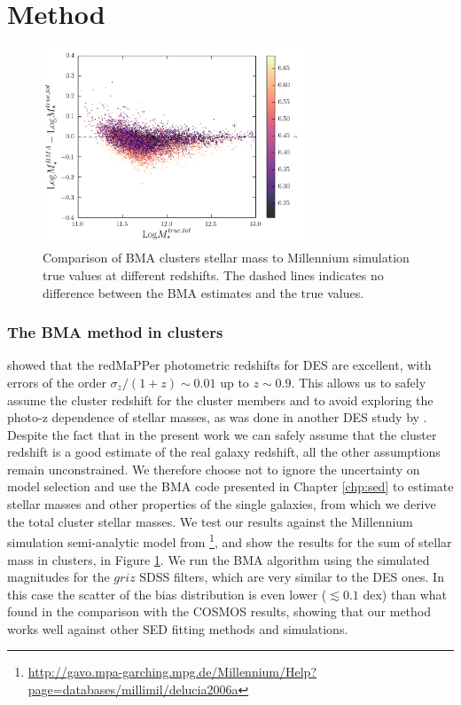 \section{Method}\label{methodsec}

\begin{figure}\centering\includegraphics[width=0.7\textwidth]{./chapters/chapter5/figs/delucia_delta_clustersmass.png}\caption{Comparison of BMA clusters stellar mass to Millennium simulation true values at different redshifts. The dashed lines indicates no difference between the BMA estimates and the true values.}\label{fig:sims}\end{figure}

\subsubsection{The BMA method in clusters}
\citet{redmappersv} showed that  the redMaPPer photometric redshifts for DES  are excellent, with errors of the order $\sigma_z/(1+z)\sim 0.01$ up to $z\sim 0.9$. This allows us to safely assume the cluster redshift for the  cluster members and to avoid exploring the photo-z dependence of stellar masses, as was done in another DES study by \citet{capozzi}.
Despite the fact that in the present work we can safely  assume that the  cluster redshift is a good estimate of the real galaxy redshift, all the other  assumptions remain unconstrained.  We therefore choose not to ignore the uncertainty on model selection and use the BMA code presented in Chapter \ref{chp:sed} to estimate stellar masses and other properties of the single galaxies, from which we derive the total cluster stellar masses.
We test our results against the Millennium simulation semi-analytic model from \citet{delucia}\footnote{\url{http://gavo.mpa-garching.mpg.de/Millennium/Help?page=databases/millimil/delucia2006a}}, and show the results for the sum of stellar mass in clusters, in Figure \ref{fig:sims}. We run the BMA algorithm using the simulated magnitudes for the $griz$ SDSS filters, which are very similar to the DES ones. In this case the scatter of the bias distribution is even lower ($\lesssim 0.1$ dex) than what found in the comparison with the COSMOS results, showing that our method works well against other SED fitting methods and simulations. 

